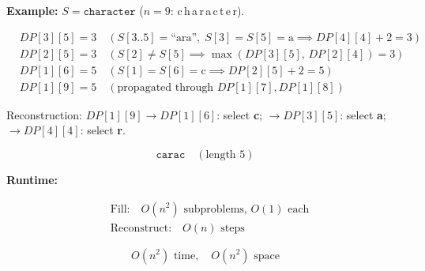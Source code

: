 \documentclass[11pt]{article}
\begin{document}
\bigskip

\textbf{Example:} $S = \texttt{character}$ \quad ($n = 9$: c\,h\,a\,r\,a\,c\,t\,e\,r).

\begin{align*}
&DP[3][5] = 3 \quad (S[3..5] = \text{``ara''},\; S[3] = S[5] = \text{a} \implies DP[4][4] + 2 = 3) \\
&DP[2][5] = 3 \quad (S[2] \ne S[5] \implies \max(DP[3][5],\, DP[2][4]) = 3) \\
&DP[1][6] = 5 \quad (S[1] = S[6] = \text{c} \implies DP[2][5] + 2 = 5) \\
&DP[1][9] = 5 \quad (\text{propagated through } DP[1][7], DP[1][8])
\end{align*}

Reconstruction: $DP[1][9] \to DP[1][6]$: select \textbf{c}; $\to DP[3][5]$: select \textbf{a}; $\to DP[4][4]$: select \textbf{r}.

\[
\boxed{\texttt{carac} \quad (\text{length } 5)}
\]

\textbf{Runtime:}

\begin{align*}
&\text{Fill:} \quad O(n^2) \text{ subproblems, } O(1) \text{ each} \\
&\text{Reconstruct:} \quad O(n) \text{ steps}
\end{align*}

\[
\boxed{O(n^2) \text{ time}, \quad O(n^2) \text{ space}}
\]
\end{document}
